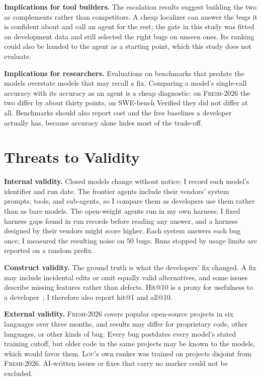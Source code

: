 \documentclass[acmsmall,screen,review,anonymous]{acmart}
\newcommand{\tool}{\textsc{Loc}\xspace}
\newcommand{\tool}{Allfather\xspace}
\newcommand{\fresh}{\textsc{Fresh-2026}\xspace}
\begin{document}
\textbf{Implications for tool builders.} The escalation results suggest building the two as complements rather than competitors. A cheap localizer can answer the bugs it is confident about and call an agent for the rest; the gate in this study was fitted on development data and still selected the right bugs on unseen ones. Its ranking could also be handed to the agent as a starting point, which this study does not evaluate.

\textbf{Implications for researchers.} Evaluations on benchmarks that predate the models overstate models that may recall a fix. Comparing a model's single-call accuracy with its accuracy as an agent is a cheap diagnostic: on \fresh the two differ by about thirty points, on SWE-bench Verified they did not differ at all. Benchmarks should also report cost and the free baselines a developer actually has, because accuracy alone hides most of the trade-off.

\section{Threats to Validity}
\label{sec:threats}

\textbf{Internal validity.} Closed models change without notice; I record each model's identifier and run date. The frontier agents include their vendors' system prompts, tools, and sub-agents, so I compare them as developers use them rather than as bare models. The open-weight agents run in my own harness; I fixed harness gaps found in run records before reading any answer, and a harness designed by their vendors might score higher. Each system answers each bug once; I measured the resulting noise on 50 bugs. Runs stopped by usage limits are reported on a random prefix.

\textbf{Construct validity.} The ground truth is what the developers' fix changed. A fix may include incidental edits or omit equally valid alternatives, and some issues describe missing features rather than defects. Hit@10 is a proxy for usefulness to a developer~\cite{kochhar2016practitioners,parnin2011automated}; I therefore also report hit@1 and all@10.

\textbf{External validity.} \fresh covers popular open-source projects in six languages over three months, and results may differ for proprietary code, other languages, or other kinds of bug. Every bug postdates every model's stated training cutoff, but older code in the same projects may be known to the models, which would favor them. \tool's own ranker was trained on projects disjoint from \fresh. AI-written issues or fixes that carry no marker could not be excluded.
\end{document}
